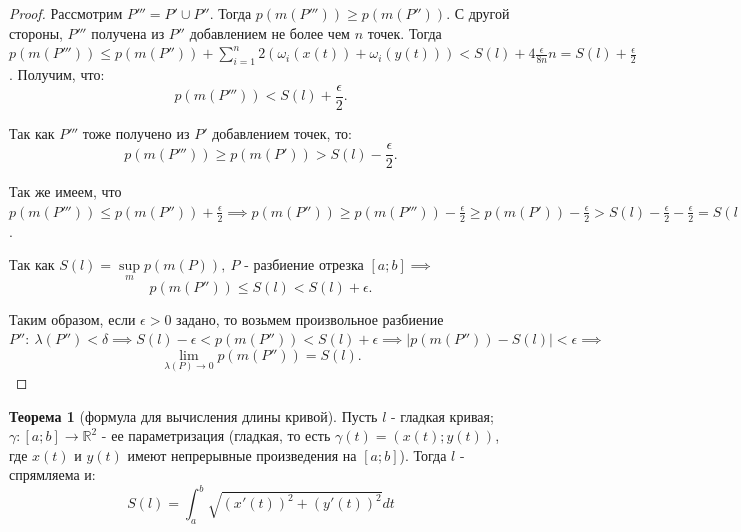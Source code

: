 \documentclass{report}
\theoremstyle{definition}
\newtheorem{theorem}{Теорема}[section]
\begin{document}
\begin{proof}
  Рассмотрим $P''' = P' \cup P''$. Тогда $p(m(P''')) \geqslant p(m(P''))$. С другой стороны, $P'''$
  получена из $P''$ добавлением не более чем $n$ точек. Тогда $p(m(P''')) \leqslant p(m(P'')) +
    \sum_{i=1}^{n}2(\omega_i(x(t)) + \omega_i(y(t))) < S(l) + 4 \frac{\epsilon}{8n}n = S(l) +
    \frac{\epsilon}{2}$. Получим, что:
  \begin{equation*}
    p(m(P''')) < S(l) + \frac{\epsilon}{2}.
  \end{equation*}

  Так как $P'''$ тоже получено из $P'$ добавлением точек, то:
  \begin{equation*}
    p(m(P''')) \geqslant p(m(P')) > S(l) - \frac{\epsilon}{2}.
  \end{equation*}

  Так же имеем, что $p(m(P''')) \leqslant p(m(P'')) + \frac{\epsilon}{2} \implies p(m(P'')) \geqslant
    p(m(P''')) - \frac{\epsilon}{2} \geqslant p(m(P')) - \frac{\epsilon}{2} > S(l) - \frac{\epsilon}{2}
    - \frac{\epsilon}{2} = S(l) - \epsilon$.

  Так как $S(l) = \underset{m}{\sup} p(m(P)), \ P$ - разбиение отрезка $[a;b] \implies$
  \begin{equation*}
    p(m(P'')) \leqslant S(l) < S(l) + \epsilon.
  \end{equation*}

  Таким образом, если $\epsilon > 0$ задано, то возьмем произвольное разбиение $P'': \ \lambda(P'') <
    \delta \implies S(l) - \epsilon < p(m(P'')) < S(l) + \epsilon \implies | p(m(P'')) - S(l) | < \epsilon
    \implies$
  \begin{equation*}
    \underset{\lambda(P)\rightarrow0}{\lim}p(m(P'')) = S(l).
  \end{equation*}
\end{proof}

\begin{theorem}[формула для вычисления длины кривой]
  Пусть $l$ - гладкая кривая; $\gamma:[a;b]\rightarrow\mathbb{R}^2$ - ее параметризация (гладкая,
  то есть $\gamma(t) = (x(t);y(t))$, где $x(t)$ и $y(t)$ имеют непрерывные произведения на $[a;b]$).
  Тогда $l$ - спрямляема и:
  \begin{equation*}
    S(l) = \int_{a}^{b}\sqrt{(x'(t))^2 + (y'(t))^2}dt
  \end{equation*}
\end{theorem}
\end{document}
